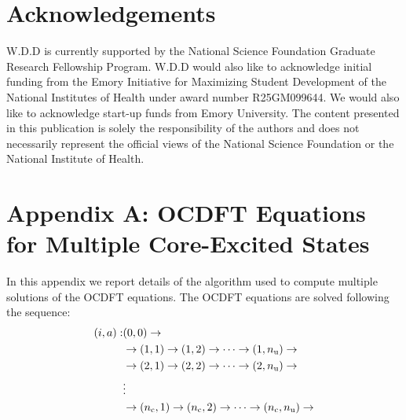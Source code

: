 \documentclass[12pt]{article}
\begin{document}
\section{Acknowledgements}
W.D.D is currently supported by the National Science Foundation Graduate Research Fellowship Program. W.D.D would also like to acknowledge initial funding from the Emory Initiative for Maximizing Student Development of the National Institutes of Health under award number R25GM099644. We would also like to acknowledge start-up funds from Emory University. The content presented in this publication is solely the responsibility of the authors and does not necessarily represent the official views of the National Science Foundation or the National Institute of Health.\\

%
%
\appendix
\renewcommand{\theequation}{A\arabic{equation}}
\section*{Appendix A: OCDFT Equations for Multiple Core-Excited States}
In this appendix we report details of the algorithm used to compute multiple solutions of the OCDFT equations.
The OCDFT equations are solved following the sequence:
\begin{equation}
\begin{split}
(i,a) : &(0,0) \rightarrow \\
        &\rightarrow (1,1) \rightarrow (1,2) \rightarrow \cdots \rightarrow (1,n_{\rm u})  \rightarrow\\
        &\rightarrow  (2,1) \rightarrow (2,2) \rightarrow \cdots \rightarrow (2,n_{\rm u})  \rightarrow\\
        & \vdots\\
        &\rightarrow  (n_{\rm c},1) \rightarrow (n_{\rm c},2) \rightarrow \cdots \rightarrow (n_{\rm c},n_{\rm u})  \rightarrow
\end{split}
\end{equation}
\end{document}
